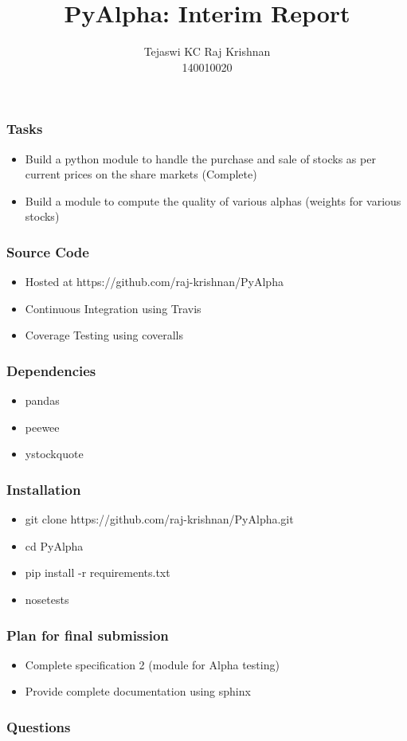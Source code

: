 \documentclass[serif,mathserif]{beamer}
\author[Tejaswi KC, Raj Krishnan]{Tejaswi KC \quad Raj Krishnan \\ 140010020 \quad 140010007}
\title[PyAlpha\hspace{2em}\insertframenumber/\inserttotalframenumber]{PyAlpha: Interim Report}
\institute{Indian Institute of Technology, Bombay}
\begin{document}
  \maketitle

  \begin{frame}
    \frametitle{Tasks}
    \begin{itemize}
      \item Build a python module to handle the purchase and sale of stocks
       as per current prices on the share markets (Complete)
      \item Build a module to compute the quality of various alphas (weights
       for various stocks)
    \end{itemize}
  \end{frame}

  \begin{frame}
    \frametitle{Source Code}
    \begin{itemize}
      \item Hosted at https://github.com/raj-krishnan/PyAlpha
      \item Continuous Integration using Travis
      \item Coverage Testing using coveralls
      \end{itemize}
  \end{frame}

  \begin{frame}
    \frametitle{Dependencies}
    \begin{itemize}
      \item pandas
      \item peewee
      \item ystockquote
    \end{itemize}
  \end{frame}

  \begin{frame}
    \frametitle{Installation}
    \begin{itemize}
      \item git clone https://github.com/raj-krishnan/PyAlpha.git
      \item cd PyAlpha
      \item pip install -r requirements.txt
      \item nosetests
    \end{itemize}
  \end{frame}

  \begin{frame}
    \frametitle{Plan for final submission}
    \begin{itemize}
      \item Complete specification 2 (module for Alpha testing)
      \item Provide complete documentation using sphinx
    \end{itemize}
  \end{frame}

  \begin{frame}
    \frametitle{Questions}
  \end{frame}
\end{document}

